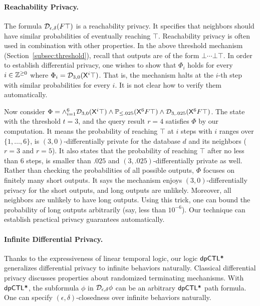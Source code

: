 \paragraph{Reachability Privacy.}
The formula $\mathcal{D}_{{\epsilon}, {\delta}}(F \top)$ is a reachability privacy. It specifies that neighbors should have similar probabilities of eventually reaching $\top$. Reachability privacy is often used in combination with other properties.
In the above threshold mechanism (Section~\ref{subsec:threshold}),
recall that outputs are of the form $\bot \cdots \bot \top$. In order
to establish differential privacy, one wishes to show that $\Phi_i$
holds for every $i \in \mathbb{Z}^{\geq 0}$ where $\Phi_i =
\mathcal{D}_{{3}, {0}}(\mathsf{X}^i \top)$. That is, the mechanism halts at the $i$-th
step with similar probabilities for every $i$. 
It is not clear how to verify them automatically. 

Now consider $\Phi=\wedge_{i=1}^{6} \mathcal{D}_{{3}, {0}}(\mathsf{X}^i \top) 
\wedge \mathbb{P}_{\le .025}(\mathsf{X}^6 F \top) \wedge \mathcal{D}_{{3}, {.025}}(\mathsf{X}^6 F
\top)$. The state with the threshold $t=3$, and the query result $r=4$ 
satisfies $\Phi$ by our computation. It means the
probability of reaching $\top$ at $i$ steps with $i$ ranges over
$\{1,\ldots,6\}$, is $(3, 0)$-differentially private for the database
$d$ and its neighbors ($r=3$ and $r=5$). It also states that the
probability of reaching $\top$ after no less than $6$ steps, is
smaller than $.025$ and $(3, .025)$-differentially private as well. 
Rather than checking the probabilities of all possible outputs, $\Phi$
focuses on finitely many short outputs. It says the mechanism enjoys $(3,
0)$-differentially privacy for the short outputs, and long outputs are
unlikely. Moreover, all neighbors are unlikely to have long outputs. 
Using this trick, one can bound the probability of long outputs
arbitrarily (say, less than $10^{-6}$). Our technique can establish
practical privacy guarantees automatically. 


\paragraph{Infinite Differential Privacy.}
Thanks to the expressiveness of linear temporal logic, our logic $\textsf{dpCTL*}$ generalizes differential privacy to infinite
behaviors naturally. Classical differential privacy discusses properties about
randomized terminating mechanisms.
With $\textsf{dpCTL*}$, the subformula $\phi$ in $\mathcal{D}_{{\epsilon}, {\delta}} \phi$
can be an arbitrary $\textsf{dpCTL*}$ path formula. One can specify
$(\epsilon, \delta)$-closedness over infinite behaviors naturally.

